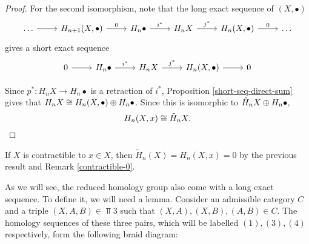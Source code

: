 \begin{proof}
For the second isomorphism, note that the long exact sequence of $(X,\bullet)$
\[\begin{tikzcd}
\dots \arrow[r] & {H_{n+1}(X,\bullet)} \arrow[r, "0"] & H_n\bullet \arrow[r, "i^*"] & H_nX \arrow[r, "j^*"] & {H_n(X,\bullet)} \arrow[r, "0"] & \dots
\end{tikzcd}\]
gives a short exact sequence
\[\begin{tikzcd}
0 \arrow[r] & H_n\bullet \arrow[r, "i^*"] & H_nX \arrow[r, "j^*"] & {H_n(X,\bullet)} \arrow[r] & 0
\end{tikzcd}\]

Since $p^*:H_nX\rightarrow H_n\bullet$ is a retraction of $i^*$, Proposition \ref{short-seq-direct-sum} gives that $H_nX\cong H_n(X,\bullet)\oplus H_n\bullet$. Since this is isomorphic to $\tilde{H}_nX\oplus H_n\bullet$, $$H_n(X,x)\cong \tilde{H}_nX.$$
\end{proof}

\begin{corollary}
If $X$ is contractible to $x\in X$, then $\tilde{H}_n(X)=H_n(X,x)=0$ by the previous result and Remark \ref{contractible-0}.
\end{corollary}


As we will see, the reduced homology group also come with a long exact sequence. To define it, we will need a lemma. Consider an admissible category $C$ and a triple $(X,A,B)\in \Top{3}$ such that $(X,A),(X,B),(A,B)\in C$. The homology sequences of these three pairs, which will be labelled $(1),(3),(4)$ respectively, form the following braid diagram:

